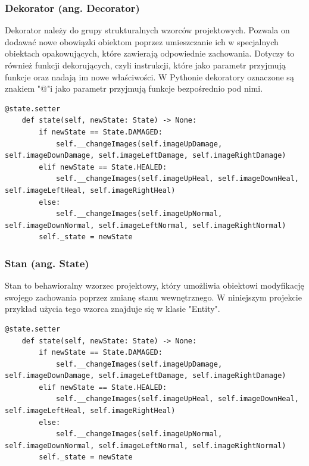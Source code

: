 \documentclass{article}
\begin{document}
\subsubsection{Dekorator (ang. Decorator) \cite{wiki:Decorator}}
Dekorator należy do grupy strukturalnych wzorców projektowych. Pozwala on dodawać nowe obowiązki obiektom poprzez umieszczanie ich w specjalnych obiektach opakowujących, które zawierają odpowiednie zachowania. Dotyczy to również funkcji dekorujących, czyli instrukcji, które jako parametr przyjmują funkcje oraz nadają im nowe właściwości. W Pythonie dekoratory oznaczone są znakiem "@"\space i jako parametr przyjmują funkcje bezpośrednio pod nimi.
\begin{center}
    \begin{lstlisting}[language=pythonSchema]
    @state.setter
    def state(self, newState: State) -> None:
        if newState == State.DAMAGED:
            self.__changeImages(self.imageUpDamage, self.imageDownDamage, self.imageLeftDamage, self.imageRightDamage)
        elif newState == State.HEALED:
            self.__changeImages(self.imageUpHeal, self.imageDownHeal, self.imageLeftHeal, self.imageRightHeal)
        else:
            self.__changeImages(self.imageUpNormal, self.imageDownNormal, self.imageLeftNormal, self.imageRightNormal)
        self._state = newState
    \end{lstlisting}
\end{center}
\subsubsection{Stan (ang. State) \cite{wiki:State}}
Stan to behawioralny wzorzec projektowy, który umożliwia obiektowi modyfikację swojego zachowania poprzez zmianę stanu wewnętrznego. W niniejszym projekcie przykład użycia tego wzorca znajduje się w klasie "Entity".
\begin{center}
    \begin{lstlisting}[language=pythonSchema]
    @state.setter
    def state(self, newState: State) -> None:
        if newState == State.DAMAGED:
            self.__changeImages(self.imageUpDamage, self.imageDownDamage, self.imageLeftDamage, self.imageRightDamage)
        elif newState == State.HEALED:
            self.__changeImages(self.imageUpHeal, self.imageDownHeal, self.imageLeftHeal, self.imageRightHeal)
        else:
            self.__changeImages(self.imageUpNormal, self.imageDownNormal, self.imageLeftNormal, self.imageRightNormal)
        self._state = newState
    \end{lstlisting}
\end{center}
\newpage
\end{document}
